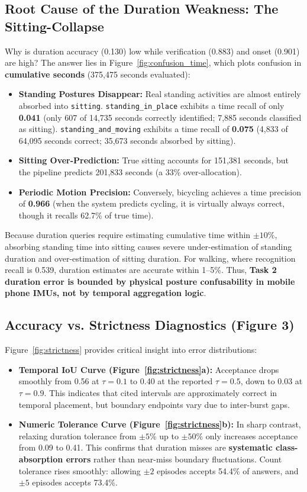 \documentclass[11pt,a4paper]{article}
\begin{document}
\subsection{Root Cause of the Duration Weakness: The Sitting-Collapse}
Why is duration accuracy (0.130) low while verification (0.883) and onset (0.901) are high? The answer lies in Figure~\ref{fig:confusion_time}, which plots confusion in \textbf{cumulative seconds} (375,475 seconds evaluated):
\begin{itemize}[noitemsep,topsep=1pt]
  \item \textbf{Standing Postures Disappear:} Real standing activities are almost entirely absorbed into \texttt{sitting}. \texttt{standing\_in\_place} exhibits a time recall of only \textbf{0.041} (only 607 of 14,735 seconds correctly identified; 7,885 seconds classified as sitting). \texttt{standing\_and\_moving} exhibits a time recall of \textbf{0.075} (4,833 of 64,095 seconds correct; 35,673 seconds absorbed by sitting).
  \item \textbf{Sitting Over-Prediction:} True sitting accounts for 151,381 seconds, but the pipeline predicts 201,833 seconds (a 33\% over-allocation).
  \item \textbf{Periodic Motion Precision:} Conversely, bicycling achieves a time precision of \textbf{0.966} (when the system predicts cycling, it is virtually always correct, though it recalls 62.7\% of true time).
\end{itemize}
Because duration queries require estimating cumulative time within $\pm 10\%$, absorbing standing time into sitting causes severe under-estimation of standing duration and over-estimation of sitting duration. For walking, where recognition recall is 0.539, duration estimates are accurate within 1--5\%. Thus, \textbf{Task 2 duration error is bounded by physical posture confusability in mobile phone IMUs, not by temporal aggregation logic}.

\subsection{Accuracy vs. Strictness Diagnostics (Figure 3)}
Figure~\ref{fig:strictness} provides critical insight into error distributions:
\begin{itemize}[noitemsep,topsep=1pt]
  \item \textbf{Temporal IoU Curve (Figure~\ref{fig:strictness}a):} Acceptance drops smoothly from 0.56 at $\tau = 0.1$ to 0.40 at the reported $\tau = 0.5$, down to 0.03 at $\tau = 0.9$. This indicates that cited intervals are approximately correct in temporal placement, but boundary endpoints vary due to inter-burst gaps.
  \item \textbf{Numeric Tolerance Curve (Figure~\ref{fig:strictness}b):} In sharp contrast, relaxing duration tolerance from $\pm 5\%$ up to $\pm 50\%$ only increases acceptance from 0.09 to 0.41. This confirms that duration misses are \textbf{systematic class-absorption errors} rather than near-miss boundary fluctuations. Count tolerance rises smoothly: allowing $\pm 2$ episodes accepts 54.4\% of answers, and $\pm 5$ episodes accepts 73.4\%.
\end{itemize}
\end{document}

